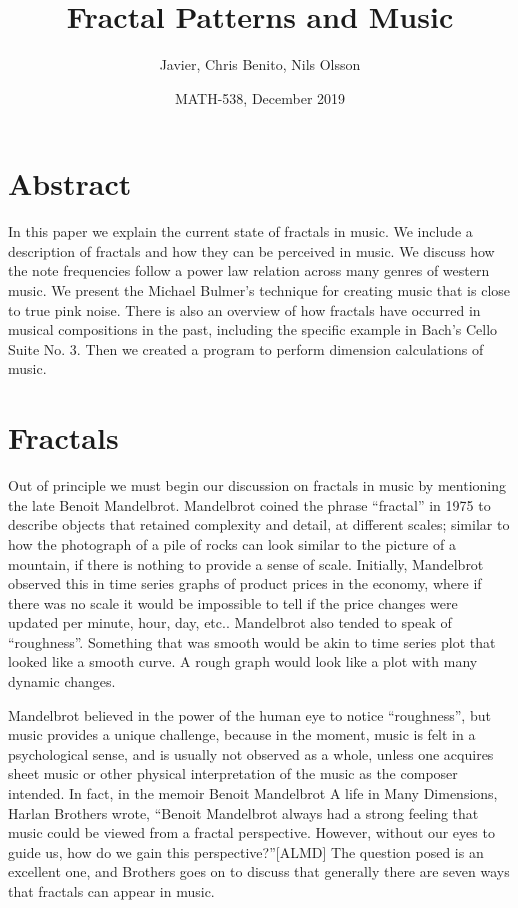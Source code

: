 \documentclass{article}
\title{Fractal Patterns and Music}
\date{MATH-538, December 2019}
\author{Javier, Chris Benito, Nils Olsson}
\begin{document}
\maketitle

\section{Abstract}

In this paper we explain the current state of fractals in music. We
include a description of fractals and how they can be perceived in music. We
discuss how the note frequencies follow a power law relation across many genres
of western music. We present the Michael Bulmer’s technique for creating music
that is close to true pink noise. There is also an overview of how fractals have
occurred in musical compositions in the past, including the specific example in
Bach’s Cello Suite No. 3. Then we created a program to perform dimension
calculations of music.

\section{Fractals}

Out of principle we must begin our discussion on fractals in music by mentioning
the late Benoit Mandelbrot. Mandelbrot coined the phrase “fractal” in 1975 to
describe objects that retained complexity and detail, at different scales;
similar to how the photograph of a pile of rocks can look similar to the picture
of a mountain, if there is nothing to provide a sense of scale\cite{3}. Initially,
Mandelbrot observed this in time series graphs of product prices in the economy,
where if there was no scale it would be impossible to tell if the price changes
were updated per minute, hour, day, etc.\cite{3}. Mandelbrot also tended to speak of
“roughness”\cite{4}. Something that was smooth would be akin to time series plot that
looked like a smooth curve. A rough graph would look like a plot with many
dynamic changes.

Mandelbrot believed in the power of the human eye to notice
“roughness”\cite{3,4}, but music provides a unique challenge, because in the
moment, music is felt in a psychological sense, and is usually not observed as a
whole, unless one acquires sheet music or other physical interpretation of the
music as the composer intended. In fact, in the memoir Benoit Mandelbrot A life
in Many Dimensions, Harlan Brothers wrote, “Benoit Mandelbrot always had a
strong feeling that music could be viewed from a fractal perspective. However,
without our eyes to guide us, how do we gain this perspective?”[ALMD] The
question posed is an excellent one, and Brothers goes on to discuss that
generally there are seven ways that fractals can appear in music.
\end{document}
